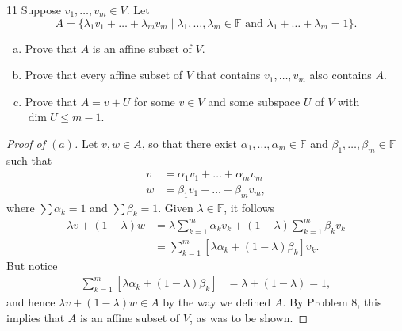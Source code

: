 \documentclass[11pt]{extarticle}
\newenvironment{problem}[1]{\begin{prob*}{#1}{}}{\end{prob*}}
\newcommand{\F}{\mathbb{F}}
\begin{document}
\begin{problem}{11}
Suppose $v_1,\dots, v_m\in V$.  Let
\begin{equation*}
A = \{\lambda_1 v_1 + \dots + \lambda_m v_m\mid \lambda_1,\dots,\lambda_m\in\F\text{ and }\lambda_1 + \dots + \lambda_m = 1\}.
\end{equation*}
\begin{enumerate}[(a)]
\item Prove that $A$ is an affine subset of $V$.
\item Prove that every affine subset of $V$ that contains $v_1,\dots, v_m$ also contains $A$.
\item Prove that $A = v + U$ for some $v\in V$ and some subspace $U$ of $V$ with $\dim U\leq m - 1$.
\end{enumerate}
\end{problem}
\begin{proof}[Proof of $(a)$]
Let $v,w\in A$, so that there exist $\alpha_1,\dots, \alpha_m\in\F$ and $\beta_1,\dots, \beta_m\in\F$ such that
\begin{align*}
v &= \alpha_1v_1 + \dots + \alpha_mv_m\\
w &= \beta_1v_1 + \dots + \beta_mv_m,
\end{align*}
where $\sum \alpha_k = 1$ and $\sum\beta_k = 1$.  Given $\lambda\in\F$, it follows
\begin{align*}
\lambda v + (1 - \lambda)w &= \lambda\sum_{k = 1}^m \alpha_kv_k + (1 - \lambda)\sum_{k = 1}^m\beta_kv_k\\
&= \sum_{k = 1}^m\left[\lambda \alpha_k + (1 - \lambda)\beta_k\right]v_k.
\end{align*}
But notice
\begin{align*}
\sum_{k = 1}^m\left[\lambda \alpha_k + (1 - \lambda)\beta_k\right] &= \lambda + (1 - \lambda) = 1,
\end{align*}
and hence $\lambda v + (1 - \lambda)w \in A$ by the way we defined $A$.  By Problem 8, this implies that $A$ is an affine subset of $V$, as was to be shown.
\end{proof}
\end{document}

